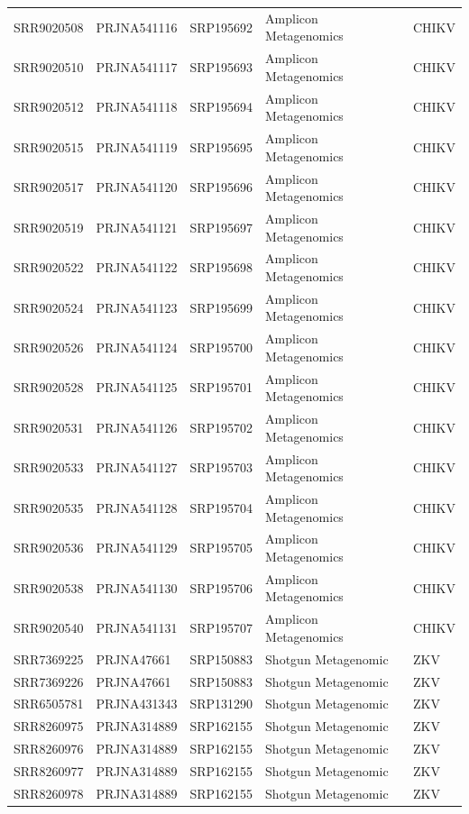 \begin{longtable}{@{}lllll@{}}
SRR9020508 & PRJNA541116 & SRP195692 & Amplicon Metagenomics & CHIKV    \\
SRR9020510 & PRJNA541117 & SRP195693 & Amplicon Metagenomics & CHIKV    \\
SRR9020512 & PRJNA541118 & SRP195694 & Amplicon Metagenomics & CHIKV    \\
SRR9020515 & PRJNA541119 & SRP195695 & Amplicon Metagenomics & CHIKV    \\
SRR9020517 & PRJNA541120 & SRP195696 & Amplicon Metagenomics & CHIKV    \\
SRR9020519 & PRJNA541121 & SRP195697 & Amplicon Metagenomics & CHIKV    \\
SRR9020522 & PRJNA541122 & SRP195698 & Amplicon Metagenomics & CHIKV    \\
SRR9020524 & PRJNA541123 & SRP195699 & Amplicon Metagenomics & CHIKV    \\
SRR9020526 & PRJNA541124 & SRP195700 & Amplicon Metagenomics & CHIKV    \\
SRR9020528 & PRJNA541125 & SRP195701 & Amplicon Metagenomics & CHIKV    \\
SRR9020531 & PRJNA541126 & SRP195702 & Amplicon Metagenomics & CHIKV    \\
SRR9020533 & PRJNA541127 & SRP195703 & Amplicon Metagenomics & CHIKV    \\
SRR9020535 & PRJNA541128 & SRP195704 & Amplicon Metagenomics & CHIKV    \\
SRR9020536 & PRJNA541129 & SRP195705 & Amplicon Metagenomics & CHIKV    \\
SRR9020538 & PRJNA541130 & SRP195706 & Amplicon Metagenomics & CHIKV    \\
SRR9020540 & PRJNA541131 & SRP195707 & Amplicon Metagenomics & CHIKV    \\
SRR7369225 & PRJNA47661  & SRP150883 & Shotgun Metagenomic   & ZKV      \\
SRR7369226 & PRJNA47661  & SRP150883 & Shotgun Metagenomic   & ZKV      \\
SRR6505781 & PRJNA431343 & SRP131290 & Shotgun Metagenomic   & ZKV      \\
SRR8260975 & PRJNA314889 & SRP162155 & Shotgun Metagenomic   & ZKV      \\
SRR8260976 & PRJNA314889 & SRP162155 & Shotgun Metagenomic   & ZKV      \\
SRR8260977 & PRJNA314889 & SRP162155 & Shotgun Metagenomic   & ZKV      \\
SRR8260978 & PRJNA314889 & SRP162155 & Shotgun Metagenomic   & ZKV      \\

\end{longtable}
